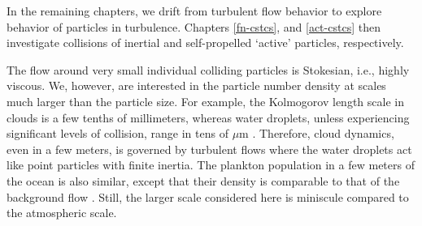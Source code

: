 \documentclass[../Rajarshi-thesis-draft.tex]{subfiles}
\begin{document}
In the remaining chapters, we drift from turbulent flow behavior to explore behavior of particles in turbulence. 
Chapters \ref{fn-cstcs}, and \ref{act-cstcs} then investigate collisions of inertial and self-propelled `active' particles, respectively. 

The flow around {very small} individual colliding particles is Stokesian, i.e., highly viscous. We, however, are interested in the particle number density at scales much larger than the particle size. For example, the Kolmogorov length scale in clouds is a few tenths of millimeters, whereas water droplets, {unless experiencing significant levels of collision,} range in {tens of} $\mu$m \cite{grabowski2013}. Therefore, cloud dynamics, even in a few meters, is governed by turbulent flows where the water droplets act like point particles with finite inertia. The plankton population in a few meters of the ocean is also similar, except that their density is comparable to {that of} the background flow \cite{pedley1992}. Still, the larger scale considered here is miniscule compared to the atmospheric scale.
\end{document}
